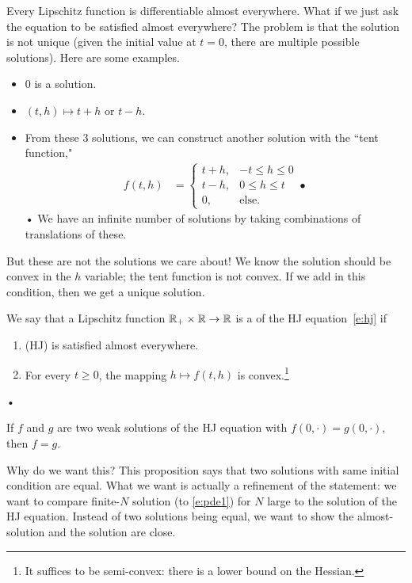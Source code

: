 Every Lipschitz function is differentiable almost everywhere. What if we just ask the equation to be satisfied almost everywhere?
The problem is that the solution is not unique (given the initial value at $t=0$, there are multiple possible solutions). Here are some examples.
\begin{itemize}
\item
0 is a solution.
\item
$(t,h)\mapsto t+h$ or $t-h$.
\item
From these 3 solutions, we can construct another solution with the ``tent function,"
\begin{align*}
f(t,h) &=\begin{cases}
t+h,&-t\le h\le 0\\
t-h,&0\le h\le t\\
0,&\text{else.}
\end{cases}•
\end{align*}•
We have an infinite number of solutions by taking combinations of translations of these.
\end{itemize}
But these are not the solutions we care about! We know the solution should be convex in the $h$ variable; the tent function is not convex. If we add in this condition, then we get a unique solution.
\begin{df}
We say that a Lipschitz function $\mathbb{R}_+\times \mathbb{R}\to \mathbb{R}$ is a  of the HJ equation~\eqref{e:hj} if
\begin{enumerate}
\item
(HJ) is satisfied almost everywhere.
\item
For every $t\ge 0$, the mapping $h\mapsto f(t,h)$ is convex.\footnote{It suffices to be semi-convex: there is a lower bound on the Hessian.}
\end{enumerate}•
\end{df}
\begin{pr}[Uniqueness]
If $f$ and $g$ are two weak solutions of the HJ equation with $f(0,\cdot)=g(0,\cdot)$, then $f=g$.
\end{pr}
Why do we want this?
This proposition says that two solutions with same initial condition are equal. What we want is actually a refinement of the statement: we want to compare finite-$N$ solution (to \eqref{e:pde1}) for $N$ large to the solution of the HJ equation.
Instead of two solutions being equal, we want to show the almost-solution and the solution are close. 

